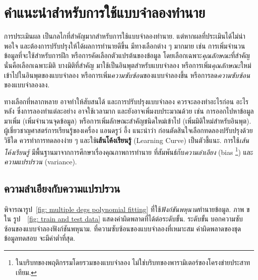 \section{คำแนะนำสำหรับการใช้แบบจำลองทำนาย}
\label{sec: practical suggestions}

การประเมินผล เป็นกลไกที่สำคัญมากสำหรับการใช้แบบจำลองทำนาย.
แต่หากผลที่ประเมินได้ไม่น่าพอใจ และต้องการปรับปรุงให้ได้ผลการทำนายดีขึ้น
มีทางเลือกต่าง ๆ มากมาย เช่น
การเพิ่มจำนวนข้อมูลที่จะใช้สำหรับการฝึก %
หรือการคัดเลือกตัวแปรต้นของข้อมูล โดยเลือกเฉพาะ\textit{คุณลักษณะ}ที่สำคัญ  นั่นคือเลือกเฉพาะมิติ บางมิติที่สำคัญ มาใช้เป็นอินพุตสำหรับแบบจำลอง %
หรือการเพิ่ม\textit{คุณลักษณะ}ใหม่เข้าไปในอินพุตของแบบจำลอง %
หรือการเพิ่ม\textit{ความซับซ้อน}ของแบบจำลองขึ้น %
หรือการลด\textit{ความซับซ้อน}ของแบบจำลองลง. %

ทางเลือกที่หลากหลาย อาจทำให้สับสนได้
และการปรับปรุงแบบจำลอง
ควรจะลองทำอะไรก่อน อะไรหลัง
ซึ่งการลองทำแต่ละอย่าง อาจใช้เวลามาก และยังอาจเพิ่มงบประมาณด้วย 
เช่น การออกไปหาข้อมูลมาเพิ่ม (เพิ่มจำนวนจุดข้อมูล) 
หรือการเพิ่มลักษณะสำคัญชนิดใหม่เข้าไป (เพิ่มมิติใหม่สำหรับอินพุต).
ผู้เชี่ยวชาญศาสตร์การเรียนรู้ของเครื่อง
แอนดรูว์ อึ้ง\cite{Ng2013a} แนะนำว่า
ก่อนตัดสินใจเลือกทดลองปรับปรุงด้วยวิธีใด
ควรทำการทดลองง่าย ๆ 
และใช้\textbf{เส้นโค้งเรียนรู้} (Learning Curve) เป็นตัวชี้แนะ.
การใช้\textit{เส้นโค้งเรียนรู้}
มีพื้นฐานมาจากการศึกษาเรื่องคุณภาพการทำนาย
ที่สัมพันธ์กับ\textit{ความลำเอียง} (bias%
\footnote{ในบริบทของพฤติกรรมโดยรวมของแบบจำลอง ไม่ใช่บริบทของพารามิเตอร์ของโครงข่ายประสาทเทียม.})
และ\textit{ความแปรปรวน} (variance).

\subsection{ความลำเอียงกับความแปรปรวน}
\label{sec: bias v.s. variance}



พิจารณารูป~\ref{fig: multiple degs polynomial fitting}
ที่ใช้\textit{ฟังก์ชันพหุนาม}ทำนายข้อมูล.
ภาพ ข ใน รูป~~\ref{fig: train and test data}
แสดงค่าผิดพลาดที่ได้ต่อระดับขั้น. 
ระดับขั้น บอกความซับซ้อนของแบบจำลองฟังก์ชันพหุนาม.
ที่ความซับซ้อนของแบบจำลองที่เหมาะสม ค่าผิดพลาดของชุดข้อมูลทดสอบ
จะมีค่าต่ำที่สุด.

